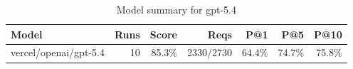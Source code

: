 \begin{table}[htbp]
\centering
\begin{tabular}{lrrrrrr}
\toprule
Model & Runs & Score & Reqs & P@1 & P@5 & P@10 \\
\midrule
vercel/openai/gpt-5.4 & 10 & 85.3\% & 2330/2730 & 64.4\% & 74.7\% & 75.8\% \\
\bottomrule
\end{tabular}
\caption{Model summary for gpt-5.4}
\end{table}
